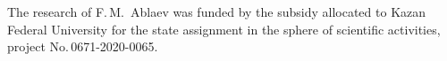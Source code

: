 

\vspace*{-24pt}

\Ack

\vspace*{-6pt}

\noindent
The research of F.\,M.~Ablaev was funded by the subsidy allocated to Kazan 
Federal University for the state assignment in the sphere of scientific activities, 
project No.\,0671-2020-0065.




  \begin{multicols}{2}

\renewcommand{\bibname}{\protect\rmfamily References}

{\small\frenchspacing
 {%
 \begin{thebibliography}{99}
 
 \vspace*{-1pt}
 

\end{thebibliography}}}
\end{multicols}
